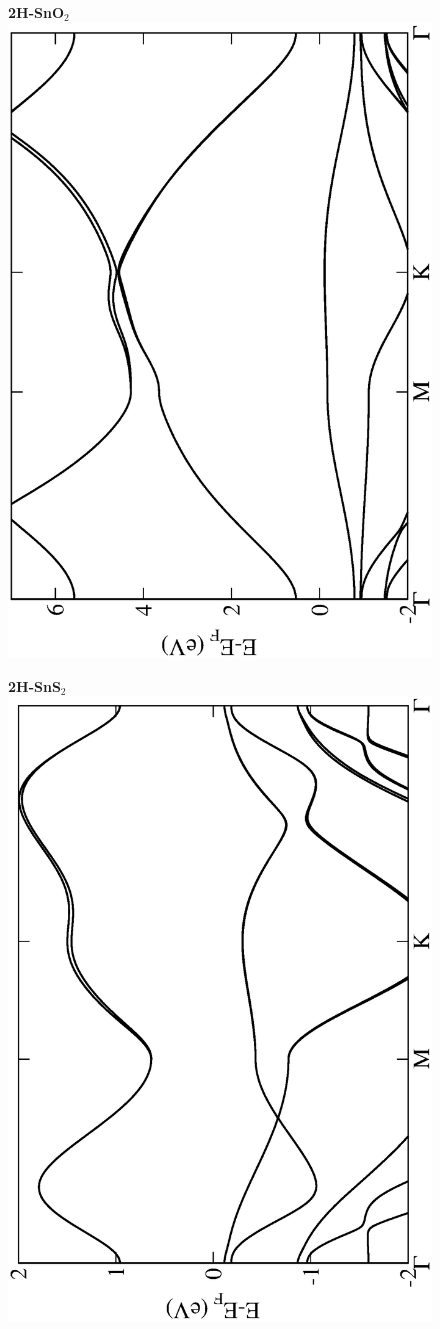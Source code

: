 \begin{figure}[htbp]
\centering
{\bfseries \sffamily 2H-SnO$_{2}$}\\
\includegraphics[width=0.45\linewidth, angle=-90, trim={2.9cm, 0cm, 2cm, 0cm}, clip]{img/SI_figs/BS/2H-SnO2.eps}
\end{figure}

\begin{figure}[htbp]
\centering
{\bfseries \sffamily 2H-SnS$_{2}$}\\
\includegraphics[width=0.45\linewidth, angle=-90, trim={2.9cm, 0cm, 2cm, 0cm}, clip]{img/SI_figs/BS/2H-SnS2.eps}
\end{figure}

